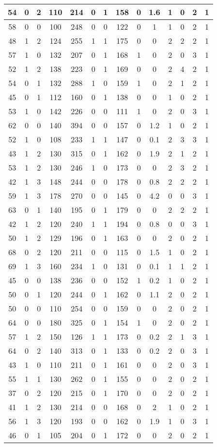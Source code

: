 \documentclass{article}
\begin{document}
\begin{tabular}{
|c|c|c|c|c|c|c|c|c|c|c|c|c|c|}
\hline
54&0&2&110&214&0&1&158&0&1.6&1&0&2&1 \\
\hline
58&0&0&100&248&0&0&122&0&1&1&0&2&1 \\
\hline
48&1&2&124&255&1&1&175&0&0&2&2&2&1 \\
\hline
57&1&0&132&207&0&1&168&1&0&2&0&3&1 \\
\hline
52&1&2&138&223&0&1&169&0&0&2&4&2&1 \\
\hline
54&0&1&132&288&1&0&159&1&0&2&1&2&1 \\
\hline
45&0&1&112&160&0&1&138&0&0&1&0&2&1 \\
\hline
53&1&0&142&226&0&0&111&1&0&2&0&3&1 \\
\hline
62&0&0&140&394&0&0&157&0&1.2&1&0&2&1 \\
\hline
52&1&0&108&233&1&1&147&0&0.1&2&3&3&1 \\
\hline
43&1&2&130&315&0&1&162&0&1.9&2&1&2&1 \\
\hline
53&1&2&130&246&1&0&173&0&0&2&3&2&1 \\
\hline
42&1&3&148&244&0&0&178&0&0.8&2&2&2&1 \\
\hline
59&1&3&178&270&0&0&145&0&4.2&0&0&3&1 \\
\hline
63&0&1&140&195&0&1&179&0&0&2&2&2&1 \\
\hline
42&1&2&120&240&1&1&194&0&0.8&0&0&3&1 \\
\hline
50&1&2&129&196&0&1&163&0&0&2&0&2&1 \\
\hline
68&0&2&120&211&0&0&115&0&1.5&1&0&2&1 \\
\hline
69&1&3&160&234&1&0&131&0&0.1&1&1&2&1 \\
\hline
45&0&0&138&236&0&0&152&1&0.2&1&0&2&1 \\
\hline
50&0&1&120&244&0&1&162&0&1.1&2&0&2&1 \\
\hline
50&0&0&110&254&0&0&159&0&0&2&0&2&1 \\
\hline
64&0&0&180&325&0&1&154&1&0&2&0&2&1 \\
\hline
57&1&2&150&126&1&1&173&0&0.2&2&1&3&1 \\
\hline
64&0&2&140&313&0&1&133&0&0.2&2&0&3&1 \\
\hline
43&1&0&110&211&0&1&161&0&0&2&0&3&1 \\
\hline
55&1&1&130&262&0&1&155&0&0&2&0&2&1 \\
\hline
37&0&2&120&215&0&1&170&0&0&2&0&2&1 \\
\hline
41&1&2&130&214&0&0&168&0&2&1&0&2&1 \\
\hline
56&1&3&120&193&0&0&162&0&1.9&1&0&3&1 \\
\hline
46&0&1&105&204&0&1&172&0&0&2&0&2&1 \\

\end{tabular}
\end{document}
